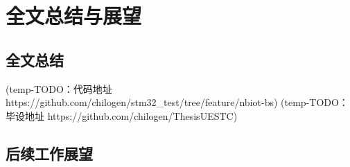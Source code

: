 \chapter{全文总结与展望}

\section{全文总结}
(temp-TODO：代码地址 https://github.com/chilogen/stm32_test/tree/feature/nbiot-bs)
(temp-TODO：毕设地址 https://github.com/chilogen/ThesisUESTC)


\section{后续工作展望}

